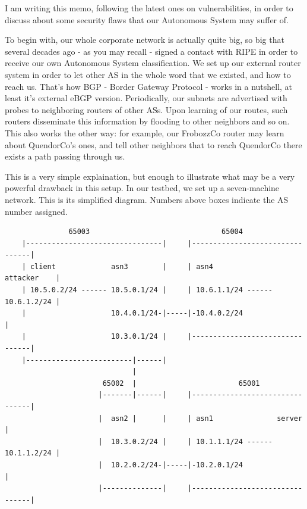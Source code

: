 \documentclass[paper=a4]{../../_global/texMemo}
\begin{document}
\maketitle

I am writing this memo, following the latest ones on vulnerabilities, in order to discuss about some security flaws that our Autonomous System may suffer of.

To begin with, our whole corporate network is actually quite big, so big that several decades ago - as you may recall - signed a contact with RIPE in order to receive our own Autonomous System classification. We set up our external router system in order to let other AS in the whole word that we existed, and how to reach us. That's how BGP - Border Gateway Protocol - works in a nutshell, at least it's external eBGP version. Periodically, our subnets are advertised with probes to neighboring routers of other ASs. Upon learning of our routes, such routers disseminate this information by flooding to other neighbors and so on. This also works the other way: for example, our FrobozzCo router may learn about QuendorCo's ones, and tell other neighbors that to reach QuendorCo there exists a path passing through us.

This is a very simple explaination, but enough to illustrate what may be a very powerful drawback in this setup. In our testbed, we set up a seven-machine network. This is its simplified diagram. Numbers above boxes indicate the AS number assigned.

\begin{verbatim}
               65003                               65004
    |--------------------------------|     |--------------------------------|
    | client             asn3        |     | asn4               attacker    |
    | 10.5.0.2/24 ------ 10.5.0.1/24 |     | 10.6.1.1/24 ------ 10.6.1.2/24 |
    |                    10.4.0.1/24-|-----|-10.4.0.2/24                    |
    |                    10.3.0.1/24 |     |--------------------------------|
    |-------------------------|------| 
                              |
                       65002  |                        65001
                      |-------|------|     |--------------------------------|
                      |  asn2 |      |     | asn1               server      |
                      |  10.3.0.2/24 |     | 10.1.1.1/24 ------ 10.1.1.2/24 |
                      |  10.2.0.2/24-|-----|-10.2.0.1/24                    |
                      |--------------|     |--------------------------------|
\end{verbatim}
\end{document}
